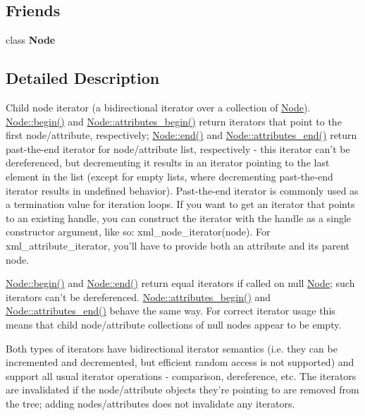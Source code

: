 \subsection*{Friends}
\begin{DoxyCompactItemize}
\item 
\hypertarget{classphys_1_1xml_1_1NodeIterator_a6db9d28bd448a131448276ee03de1e6d}{
class {\bfseries Node}}
\label{da/d4f/classphys_1_1xml_1_1NodeIterator_a6db9d28bd448a131448276ee03de1e6d}

\end{DoxyCompactItemize}


\subsection{Detailed Description}
Child node iterator (a bidirectional iterator over a collection of \hyperlink{classphys_1_1xml_1_1Node}{Node}). \hyperlink{classphys_1_1xml_1_1Node_a39a71c0c078f648de0e716ed59a0446a}{Node::begin()} and \hyperlink{classphys_1_1xml_1_1Node_a9ede8da51d334d31167a6740e233c103}{Node::attributes\_\-begin()} return iterators that point to the first node/attribute, respectively; \hyperlink{classphys_1_1xml_1_1Node_a1f083209c52d7af4a354db2b3f198cf8}{Node::end()} and \hyperlink{classphys_1_1xml_1_1Node_ac2535dd3ebc22454993f09fb66ace134}{Node::attributes\_\-end()} return past-\/the-\/end iterator for node/attribute list, respectively -\/ this iterator can't be dereferenced, but decrementing it results in an iterator pointing to the last element in the list (except for empty lists, where decrementing past-\/the-\/end iterator results in undefined behavior). Past-\/the-\/end iterator is commonly used as a termination value for iteration loops. If you want to get an iterator that points to an existing handle, you can construct the iterator with the handle as a single constructor argument, like so: xml\_\-node\_\-iterator(node). For xml\_\-attribute\_\-iterator, you'll have to provide both an attribute and its parent node.\par
\par
 \hyperlink{classphys_1_1xml_1_1Node_a39a71c0c078f648de0e716ed59a0446a}{Node::begin()} and \hyperlink{classphys_1_1xml_1_1Node_a1f083209c52d7af4a354db2b3f198cf8}{Node::end()} return equal iterators if called on null \hyperlink{classphys_1_1xml_1_1Node}{Node}; such iterators can't be dereferenced. \hyperlink{classphys_1_1xml_1_1Node_a9ede8da51d334d31167a6740e233c103}{Node::attributes\_\-begin()} and \hyperlink{classphys_1_1xml_1_1Node_ac2535dd3ebc22454993f09fb66ace134}{Node::attributes\_\-end()} behave the same way. For correct iterator usage this means that child node/attribute collections of null nodes appear to be empty.\par
\par
 Both types of iterators have bidirectional iterator semantics (i.e. they can be incremented and decremented, but efficient random access is not supported) and support all usual iterator operations -\/ comparison, dereference, etc. The iterators are invalidated if the node/attribute objects they're pointing to are removed from the tree; adding nodes/attributes does not invalidate any iterators. 

